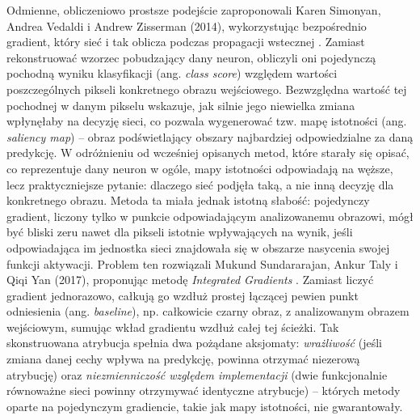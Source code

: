 Odmienne, obliczeniowo prostsze podejście zaproponowali Karen Simonyan, Andrea Vedaldi i Andrew Zisserman (2014), wykorzystując bezpośrednio gradient, który sieć i tak oblicza podczas propagacji wstecznej \cite{simonyan_deep_inside_convolutional_networks}. Zamiast rekonstruować wzorzec pobudzający dany neuron, obliczyli oni pojedynczą pochodną wyniku klasyfikacji (ang. \textit{class score}) względem wartości poszczególnych pikseli konkretnego obrazu wejściowego. Bezwzględna wartość tej pochodnej w danym pikselu wskazuje, jak silnie jego niewielka zmiana wpłynęłaby na decyzję sieci, co pozwala wygenerować tzw. mapę istotności (ang. \textit{saliency map}) -- obraz podświetlający obszary najbardziej odpowiedzialne za daną predykcję. W odróżnieniu od wcześniej opisanych metod, które starały się opisać, co reprezentuje dany neuron w ogóle, mapy istotności odpowiadają na węższe, lecz praktyczniejsze pytanie: dlaczego sieć podjęła taką, a nie inną decyzję dla konkretnego obrazu. \newline
Metoda ta miała jednak istotną słabość: pojedynczy gradient, liczony tylko w punkcie odpowiadającym analizowanemu obrazowi, mógł być bliski zeru nawet dla pikseli istotnie wpływających na wynik, jeśli odpowiadająca im jednostka sieci znajdowała się w obszarze nasycenia swojej funkcji aktywacji. Problem ten rozwiązali Mukund Sundararajan, Ankur Taly i Qiqi Yan (2017), proponując metodę \textit{Integrated Gradients} \cite{sundararajan_axiomatic_attribution_for_deep_networks}. Zamiast liczyć gradient jednorazowo, całkują go wzdłuż prostej łączącej pewien punkt odniesienia (ang. \textit{baseline}), np. całkowicie czarny obraz, z analizowanym obrazem wejściowym, sumując wkład gradientu wzdłuż całej tej ścieżki. Tak skonstruowana atrybucja spełnia dwa pożądane aksjomaty: \textit{wrażliwość} (jeśli zmiana danej cechy wpływa na predykcję, powinna otrzymać niezerową atrybucję) oraz \textit{niezmienniczość względem implementacji} (dwie funkcjonalnie równoważne sieci powinny otrzymywać identyczne atrybucje) -- których metody oparte na pojedynczym gradiencie, takie jak mapy istotności, nie gwarantowały. \newline
